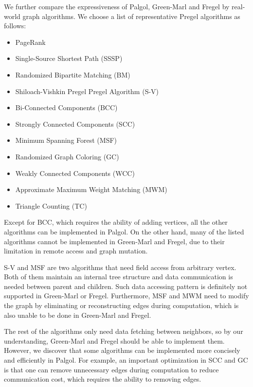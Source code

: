 \documentclass{sokendai_thesis} %
\begin{document}
We further compare the expressiveness of Palgol, Green-Marl and Fregel by real-world graph algorithms.
We choose a list of representative Pregel algorithms as follows:

\begin{itemize}\setlength\itemsep{0em}
 \item PageRank~\cite{pregel}
 \item Single-Source Shortest Path (SSSP)~\cite{pregel}
 \item Randomized Bipartite Matching (BM)~\cite{pregel}
 \item Shiloach-Vishkin Pregel Pregel Algorithm (S-V)~\cite{connectivity}
 \item Bi-Connected Components (BCC)~\cite{connectivity}
 \item Strongly Connected Components (SCC)~\cite{connectivity}
 \item Minimum Spanning Forest (MSF)~\cite{optimizing}
 \item Randomized Graph Coloring (GC)~\cite{optimizing}
 \item Weakly Connected Components (WCC)~\cite{optimizing}
 \item Approximate Maximum Weight Matching (MWM)~\cite{optimizing}
 \item Triangle Counting (TC)~\cite{triangle}
\end{itemize}

Except for BCC, which requires the ability of adding vertices, all the other algorithms can be implemented in Palgol.
On the other hand, many of the listed algorithms cannot be implemented in Green-Marl and Fregel, due to their limitation in remote access and graph mutation.

S-V and MSF are two algorithms that need field access from arbitrary vertex.
Both of them maintain an internal tree structure and data communication is needed between parent and children.
Such data accessing pattern is definitely not supported in Green-Marl or Fregel.
Furthermore, MSF and MWM need to modify the graph by eliminating or reconstructing edges during computation, which is also unable to be done in Green-Marl and Fregel.

The rest of the algorithms only need data fetching between neighbors, so by our understanding, Green-Marl and Fregel should be able to implement them.
However, we discover that some algorithms can be implemented more concisely and efficiently in Palgol.
For example, an important optimization in SCC and GC is that one can remove unnecessary edges during computation to reduce communication cost, which requires the ability to removing edges.
\end{document}
